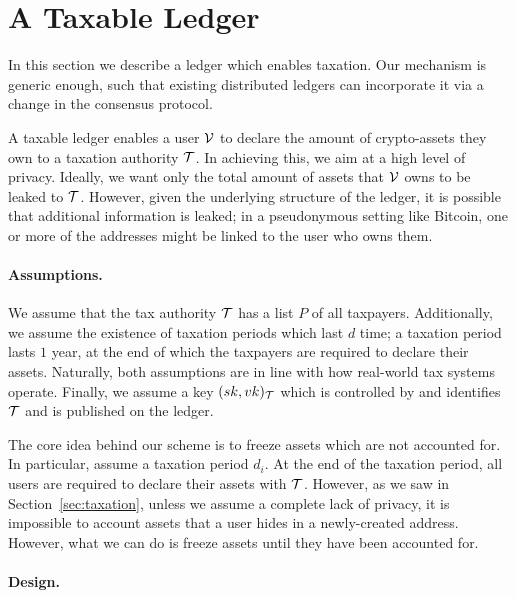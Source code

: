 \section{A Taxable Ledger}\label{sec:taxchain}

In this section we describe a ledger which enables taxation. Our mechanism is
generic enough, such that existing distributed ledgers can incorporate it via a
change in the consensus protocol.

A taxable ledger enables a user $\mathcal{V}$ to declare the amount of
crypto-assets they own to a taxation authority $\mathcal{T}$. In achieving this,
we aim at a high level of privacy. Ideally, we want only the total amount of
assets that $\mathcal{V}$ owns to be leaked to $\mathcal{T}$. However, given the
underlying structure of the ledger, it is possible that additional information
is leaked; \eg in a pseudonymous setting like Bitcoin, one or more of the
addresses might be linked to the user who owns them.

\paragraph{Assumptions.}

We assume that the tax authority $\mathcal{T}$ has a list $P$ of all taxpayers.
Additionally, we assume the existence of taxation periods which last $d$ time;
\eg a taxation period lasts $1$ year, at the end of which the taxpayers are
required to declare their assets. Naturally, both assumptions are in line with
how real-world tax systems operate. Finally, we assume a key
$(sk, vk)_\mathcal{T}$ which is controlled by and identifies $\mathcal{T}$ and is
published on the ledger.

The core idea behind our scheme is to freeze assets which are not accounted
for. In particular, assume a taxation period $d_i$. At the end of the taxation
period, all users are required to declare their assets with $\mathcal{T}$.
However, as we saw in Section~\ref{sec:taxation}, unless we assume a complete
lack of privacy, it is impossible to account assets that a user hides in a
newly-created address. However, what we can do is freeze assets until they have
been accounted for.

\paragraph{Design.}

